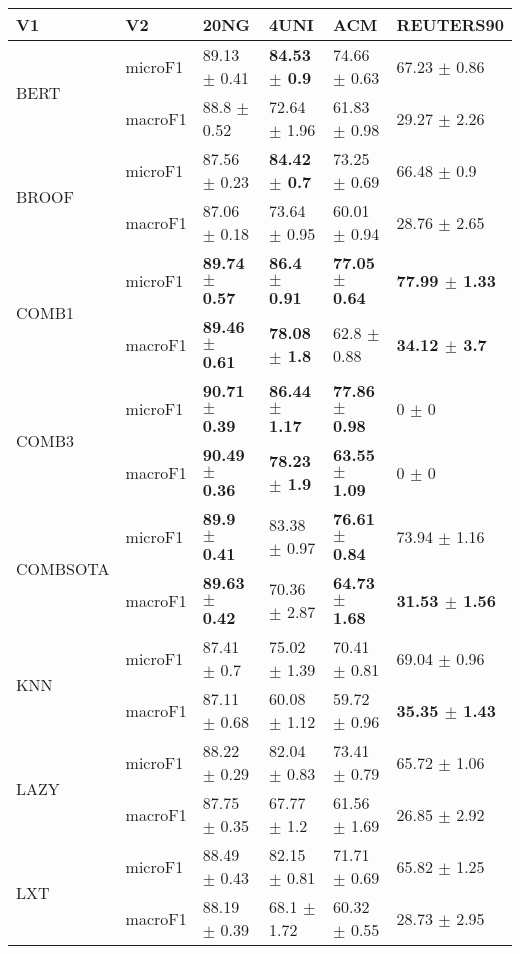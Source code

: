 \documentclass[]{article}
\begin{document}
\begin{table}[ht]
\centering
\begin{tabular}{llllll}
  \hline
V1 & V2 & 20NG & 4UNI & ACM & REUTERS90 \\ 
  \hline
\multirow{2}{*}{BERT} & microF1 & 89.13 $\pm$  0.41 & \bf{84.53 $\pm$  0.9} & 74.66 $\pm$  0.63 & 67.23 $\pm$  0.86 \\ 
   & macroF1 & 88.8 $\pm$  0.52 & 72.64 $\pm$  1.96 & 61.83 $\pm$  0.98 & 29.27 $\pm$  2.26 \\ 
  \multirow{2}{*}{BROOF} & microF1 & 87.56 $\pm$  0.23 & \bf{84.42 $\pm$  0.7} & 73.25 $\pm$  0.69 & 66.48 $\pm$  0.9 \\ 
   & macroF1 & 87.06 $\pm$  0.18 & 73.64 $\pm$  0.95 & 60.01 $\pm$  0.94 & 28.76 $\pm$  2.65 \\ 
  \multirow{2}{*}{COMB1} & microF1 & \bf{89.74 $\pm$  0.57} & \bf{86.4 $\pm$  0.91} & \bf{77.05 $\pm$  0.64} & \bf{77.99 $\pm$  1.33} \\ 
   & macroF1 & \bf{89.46 $\pm$  0.61} & \bf{78.08 $\pm$  1.8} & 62.8 $\pm$  0.88 & \bf{34.12 $\pm$  3.7} \\ 
  \multirow{2}{*}{COMB3} & microF1 & \bf{90.71 $\pm$  0.39} & \bf{86.44 $\pm$  1.17} & \bf{77.86 $\pm$  0.98} & 0 $\pm$  0 \\ 
   & macroF1 & \bf{90.49 $\pm$  0.36} & \bf{78.23 $\pm$  1.9} & \bf{63.55 $\pm$  1.09} & 0 $\pm$  0 \\ 
  \multirow{2}{*}{COMBSOTA} & microF1 & \bf{89.9 $\pm$  0.41} & 83.38 $\pm$  0.97 & \bf{76.61 $\pm$  0.84} & 73.94 $\pm$  1.16 \\ 
   & macroF1 & \bf{89.63 $\pm$  0.42} & 70.36 $\pm$  2.87 & \bf{64.73 $\pm$  1.68} & \bf{31.53 $\pm$  1.56} \\ 
  \multirow{2}{*}{KNN} & microF1 & 87.41 $\pm$  0.7 & 75.02 $\pm$  1.39 & 70.41 $\pm$  0.81 & 69.04 $\pm$  0.96 \\ 
   & macroF1 & 87.11 $\pm$  0.68 & 60.08 $\pm$  1.12 & 59.72 $\pm$  0.96 & \bf{35.35 $\pm$  1.43} \\ 
  \multirow{2}{*}{LAZY} & microF1 & 88.22 $\pm$  0.29 & 82.04 $\pm$  0.83 & 73.41 $\pm$  0.79 & 65.72 $\pm$  1.06 \\ 
   & macroF1 & 87.75 $\pm$  0.35 & 67.77 $\pm$  1.2 & 61.56 $\pm$  1.69 & 26.85 $\pm$  2.92 \\ 
  \multirow{2}{*}{LXT} & microF1 & 88.49 $\pm$  0.43 & 82.15 $\pm$  0.81 & 71.71 $\pm$  0.69 & 65.82 $\pm$  1.25 \\ 
   & macroF1 & 88.19 $\pm$  0.39 & 68.1 $\pm$  1.72 & 60.32 $\pm$  0.55 & 28.73 $\pm$  2.95 \\ 

\end{tabular}
\end{table}
\end{document}
